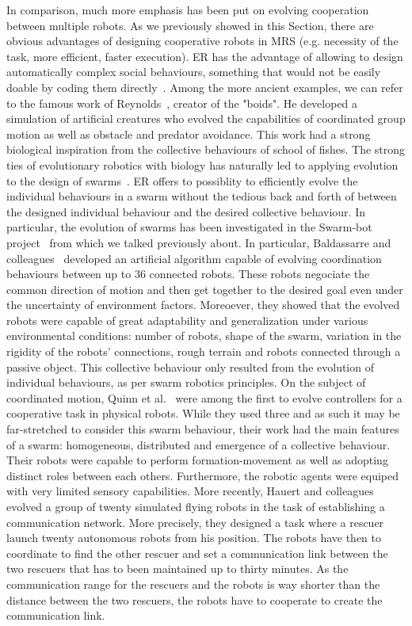     In comparison, much more emphasis has been put on evolving cooperation between multiple robots. As we previously showed in this Section, there are obvious advantages of designing cooperative robots in MRS (e.g. necessity of the task, more efficient, faster execution). ER has the advantage of allowing to design automatically complex social behaviours, something that would not be easily doable by coding them directly~\parencite{Baldassarre2003}. Among the more ancient examples, we can refer to the famous work of Reynolds~\parencite{Reynolds1992}, creator of the "boids". He developed a simulation of artificial creatures who evolved the capabilities of coordinated group motion as well as obstacle and predator avoidance. This work had a strong biological inspiration from the collective behaviours of school of fishes. The strong ties of evolutionary robotics with biology has naturally led to applying evolution to the design of swarms~\parencite{Brambilla2012, Francesca2016}. ER offers to possiblity to efficiently evolve the individual behaviours in a swarm without the tedious back and forth of between the designed individual behaviour and the desired collective behaviour. In particular, the evolution of swarms has been investigated in the Swarm-bot project~\parencite{Mondada2005} from which we talked previously about. In particular, Baldassarre and colleagues~\parencite{Baldassarre2007} developed an artificial algorithm capable of evolving coordination behaviours between up to $36$ connected robots. These robots negociate the common direction of motion and then get together to the desired goal even under the uncertainty of environment factors. Moreoever, they showed that the evolved robots were capable of great adaptability and generalization under various environmental conditions: number of robots, shape of the swarm, variation in the rigidity of the robots' connections, rough terrain and robots connected through a passive object. This collective behaviour only resulted from the evolution of individual behaviours, as per swarm robotics principles. On the subject of coordinated motion, Quinn et al.~\parencite{Quinn2003} were among the first to evolve controllers for a cooperative task in physical robots. While they used three and as such it may be far-stretched to consider this swarm behaviour, their work had the main features of a swarm: homogeneous, distributed and emergence of a collective behaviour. Their robots were capable to perform formation-movement as well as adopting distinct roles between each others. Furthermore, the robotic agents were equiped with very limited sensory capabilities. More recently, Hauert and colleagues~\parencite{Hauert2014} evolved a group of twenty simulated flying robots in the task of establishing a communication network. More precisely, they designed a task where a rescuer launch twenty autonomous robots from his position. The robots have then to coordinate to find the other rescuer and set a communication link between the two rescuers that has to been maintained up to thirty minutes. As the communication range for the rescuers and the robots is way shorter than the distance between the two rescuers, the robots have to cooperate to create the communication link. 

